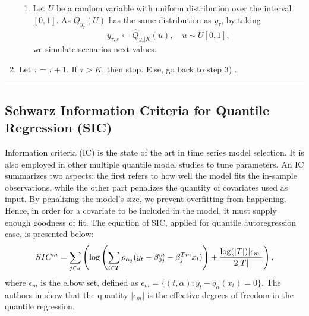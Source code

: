 \begin{enumerate}
\begin{enumerate}
		\item Let $U$ be a random variable with uniform distribution over the interval $[0,1]$. As $Q_{y_\tau}(U)$ has the same distribution as $y_\tau$, by taking
		$$y_{\tau,s} \leftarrow \hat Q_{y_\tau | X}(u), \quad u \sim U[0,1],$$
		we simulate scenarios next values.



		 \end{enumerate}
	
	
	\item Let $\tau = \tau + 1$. If $\tau > K$, then stop. Else, go back to step 3) . 


\end{enumerate}

\noindent\rule{\columnwidth}{1pt}


\subsection{Schwarz Information Criteria for Quantile Regression (SIC)} \label{sec:SIC}

Information criteria (IC) is the state of the art in time series model selection. It is also employed in other multiple quantile model studies \cite{zou_regularized_2008, jiang_interquantile_2014} to tune parameters.
An IC summarizes two aspects: the first refers to how well the model fits the in-sample observations, while the other part penalizes the quantity of covariates used as input.
By penalizing the model's size, we prevent overfitting from happening. Hence, in order for a covariate to be included in the model, it must supply enough goodness of fit.
The equation of SIC, applied for quantile autoregression case, is presented below:
 \begin{equation} 
\small
SIC^m = \sum_{j \in J} \left( \log \left(\sum_{t \in T}\rho_{\alpha_j}(y_t - \beta_{0j}^m - \beta_j^{Tm} x_t) \right) +  \frac{\log(|T|)|\epsilon_m|}{2|T|}  \right),\label{eq:SIC}
\end{equation}
where $\epsilon_m$ is the elbow set, defined as $\epsilon_m = \{(t,\alpha): y_t - q_\alpha(x_t) = 0 \}$. The authors in \cite{li_l1-norm_2008} show that the quantity $|\epsilon_m|$ is the effective degrees of freedom in the quantile regression.




